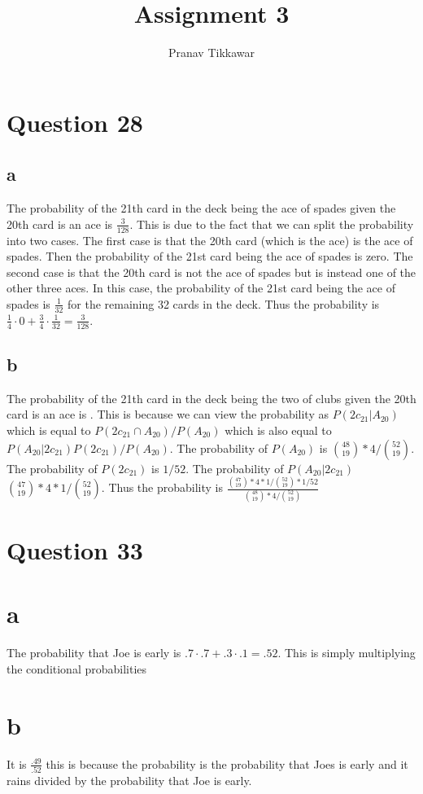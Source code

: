 \documentclass{article}
\author{Pranav Tikkawar}
\title{Assignment 3}
\begin{document}
\maketitle
\section*{Question 28}
\subsection*{a}
The probability of the 21th card in the deck being the ace of spades given the 20th card is an ace is $\frac{3}{128}$.
This is due to the fact that we can split the probability into two cases. The first case is that the 20th card (which is the ace) is the ace of spades. Then the probability of the 21st card being the ace of spades is zero. The second case is that the 20th card is not the ace of spades but is instead one of the other three aces. In this case, the probability of the 21st card being the ace of spades is $\frac{1}{32}$ for the remaining 32 cards in the deck. Thus the probability is $\frac{1}{4} \cdot 0 + \frac{3}{4} \cdot \frac{1}{32} = \frac{3}{128}$.
\subsection*{b}
The probability of the 21th card in the deck being the two of clubs given the 20th card is an ace is . This is because we can view the probability as $P(2c_{21} | A_{20})$ which is equal to $P(2c_{21} \cap A_{20})/P(A_{20})$ which is also equal to $P(A_{20}| 2c_{21})P(2c_{21})/P(A_{20})$. 
The probability of $P(A_{20})$ is $\binom{48}{19}*4/\binom{52}{19}$.
The probability of $P(2c_{21})$ is $1/52$.
The probability of $P(A_{20}| 2c_{21})$ $\binom{47}{19} *4 *1/\binom{52}{19} $.
Thus the probability is $\frac{\binom{47}{19} *4 *1/\binom{52}{19} *1/52}{\binom{48}{19}*4/\binom{52}{19}}$ 


\section*{Question 33}
\section*{a}
The probability that Joe is early is $.7 \cdot .7 + .3 \cdot .1 = .52$. This is simply multiplying the conditional probabilities 
\section*{b}
It is $\frac{.49}{.52}$ this is because the probability is the probability that Joes is early and it rains divided by the probability that Joe is early.
\end{document}

